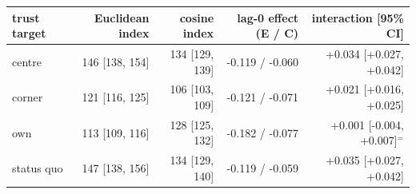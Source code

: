 \begin{tabular}{lrrrr}
\toprule
trust target & Euclidean index & cosine index & lag-0 effect (E / C) & interaction [95\% CI] \\
\midrule
centre & 146 [138, 154] & 134 [129, 139] & -0.119 / -0.060 & +0.034 [+0.027, +0.042] \\
corner & 121 [116, 125] & 106 [103, 109] & -0.121 / -0.071 & +0.021 [+0.016, +0.025] \\
own & 113 [109, 116] & 128 [125, 132] & -0.182 / -0.077 & +0.001 [-0.004, +0.007]$^{=}$ \\
status quo & 147 [138, 156] & 134 [129, 140] & -0.119 / -0.059 & +0.035 [+0.027, +0.042] \\
\bottomrule
\end{tabular}
